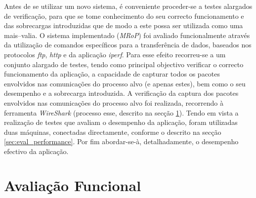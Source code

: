 








Antes de se utilizar um novo sistema, é conveniente proceder-se a testes alargados de verificação, para que se tome conhecimento do seu correcto funcionamento e das sobrecargas introduzidas que de modo a este possa ser utilizada como uma mais–valia. 
O sistema implementado (\textit{MRoP}) foi avaliado funcionalmente através da utilização de comandos específicos para a transferência de dados, baseados nos protocolos \textit{ftp}, \textit{http} e da aplicação \textit{iperf}.
Para esse efeito recorreu-se a um conjunto alargado de testes, tendo como principal objectivo verificar o correcto funcionamento da aplicação, a capacidade de capturar todos os pacotes envolvidos nas comunicações do processo alvo (e apenas estes), bem como o seu desempenho e a sobrecarga introduzida.
A verificação da captura dos pacotes envolvidos nas comunicações do processo alvo foi realizada, recorrendo à ferramenta \textit{WireShark} (processo esse, descrito na secção \ref{sec:eval_functional}).
Tendo em vista a realização de testes que avaliam o desempenho da aplicação, foram utilizadas duas máquinas, conectadas directamente, conforme o descrito  na secção \ref{sec:eval_performance}.
Por fim abordar-se-à, detalhadamente, o desempenho efectivo da aplicação.


\section{Avaliação Funcional}
\label{sec:eval_functional}


